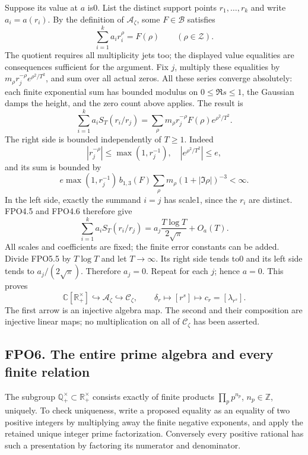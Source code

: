 Suppose its value at \(a\) is0. List the distinct support points
\(r_1,\ldots,r_k\) and write \(a_i=a(r_i)\). By the definition of
\(\mathcal A_\zeta\), some \(F\in\mathcal B\) satisfies \[
\sum_{i=1}^k a_i r_i^\rho=F(\rho)\qquad(\rho\in\mathscr Z).
\tag{FPO5.4}
\] The quotient requires all multiplicity jets too; the displayed value
equalities are consequences sufficient for the argument. Fix \(j\),
multiply these equalities by \(m_\rho r_j^{-\rho}e^{\rho^2/T^2}\), and
sum over all actual zeros. All these series converge absolutely: each
finite exponential sum has bounded modulus on \(0\le\Re s\le1\), the
Gaussian damps the height, and the zero count above applies. The result
is \[
\sum_{i=1}^k a_i S_T(r_i/r_j)
 =\sum_\rho m_\rho r_j^{-\rho}F(\rho)e^{\rho^2/T^2}.
\tag{FPO5.5}
\] The right side is bounded independently of \(T\ge1\). Indeed \[
|r_j^{-\rho}|\le\max(1,r_j^{-1}),\quad
|e^{\rho^2/T^2}|\le e,
\] and its sum is bounded by \[
e\max(1,r_j^{-1})\,b_{1,3}(F)
 \sum_\rho m_\rho(1+|\Im\rho|)^{-3}<\infty.
\tag{FPO5.6}
\] In the left side, exactly the summand \(i=j\) has scale1, since the
\(r_i\) are distinct. FPO4.5 and FPO4.6 therefore give \[
\sum_{i=1}^k a_i S_T(r_i/r_j)
 =a_j\frac{T\log T}{2\sqrt\pi}+O_a(T).
\tag{FPO5.7}
\] All scales and coefficients are fixed; the finite error constants can
be added. Divide FPO5.5 by \(T\log T\) and let \(T\to\infty\). Its right
side tends to0 and its left side tends to \(a_j/(2\sqrt\pi)\). Therefore
\(a_j=0\). Repeat for each \(j\); hence \(a=0\). This proves \[
\boxed{\mathbb C[\mathbb R_+^\times]\hookrightarrow\mathcal A_\zeta
 \hookrightarrow\mathcal C_\zeta,\qquad
 \delta_r\longmapsto[r^s]\longmapsto c_r=[\lambda_{r^s}].}
\tag{FPO5.8}
\] The first arrow is an injective algebra map. The second and their
composition are injective linear maps; no multiplication on all of
\(\mathcal C_\zeta\) has been asserted.

\subsection{FPO6. The entire prime algebra and every finite
relation}\label{fpo6.-the-entire-prime-algebra-and-every-finite-relation}

The subgroup \(\mathbb Q_+^\times\subset\mathbb R_+^\times\) consists
exactly of finite products \(\prod_p p^{n_p}\), \(n_p\in\mathbb Z\),
uniquely. To check uniqueness, write a proposed equality as an equality
of two positive integers by multiplying away the finite negative
exponents, and apply the retained unique integer prime factorization.
Conversely every positive rational has such a presentation by factoring
its numerator and denominator.

